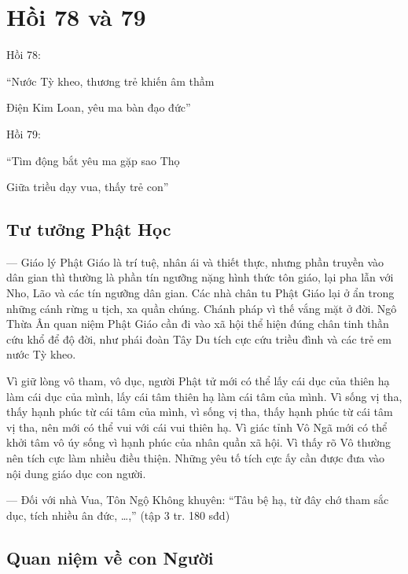 \chapter{Hồi 78 và 79} %
\label{cha:hoi_78_79}

Hồi 78:

\begin{itshape}
``Nước Tỳ kheo, thương trẻ khiến âm thầm

Điện Kim Loan, yêu ma bàn đạo đức''
\end{itshape}

Hồi 79:

\begin{itshape}
``Tìm động bắt yêu ma gặp sao Thọ

Giữa triều dạy vua, thấy trẻ con''
\end{itshape}

\section{Tư tưởng Phật Học} %
\label{sec:78_79_phat_hoc}

— Giáo lý Phật Giáo là trí tuệ, nhân ái và thiết thực, nhưng phần truyền vào dân gian thì thường là phần tín ngưỡng nặng hình thức tôn giáo, lại pha lẫn với Nho, Lão và các tín ngưỡng dân gian. Các nhà chân tu Phật Giáo lại ở ẩn trong những cánh rừng u tịch, xa quần chúng. Chánh pháp vì thế vắng mặt ở đời. Ngô Thừa Ân quan niệm Phật Giáo cần đi vào xã hội thể hiện đúng chân tinh thần cứu khổ để độ đời, như phái đoàn Tây Du tích cực cứu triều đình và các trẻ em nước Tỳ kheo.

Vì giữ lòng vô tham, vô dục, người Phật tử mới có thể lấy cái dục của thiên hạ làm cái dục của mình, lấy cái tâm thiên hạ làm cái tâm của mình. Vì sống vị tha, thấy hạnh phúc từ cái tâm của mình, vì sống vị tha, thấy hạnh phúc từ cái tâm vị tha, nên mới có thể vui với cái vui thiên hạ. Vì giác tỉnh Vô Ngã mới có thể khởi tâm vô úy sống vì hạnh phúc của nhân quần xã hội. Vì thấy rõ Vô thường nên tích cực làm nhiều điều thiện. Những yêu tố tích cực ấy cần được đưa vào nội dung giáo dục con người.

— Đối với nhà Vua, Tôn Ngộ Không khuyên: ``Tâu bệ hạ, từ đây chớ tham sắc dục, tích nhiều ân đức, \ldots,'' (tập 3 tr. 180 sđd)

\section{Quan niệm về con Người} %
\label{sec:78_79_con_nguoi}

